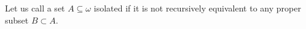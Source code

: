 Let us call a set $A \subseteq \omega$ isolated if it is not recursively equivalent to any proper subset $B \subset A$.